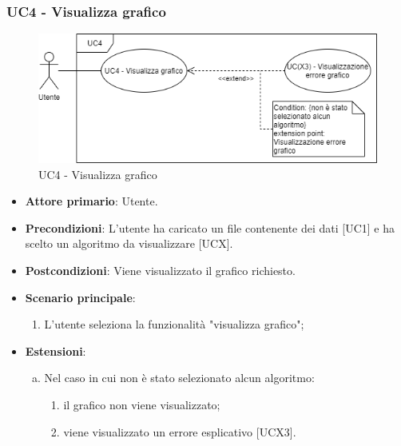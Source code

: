 \subsubsection{UC4 - Visualizza grafico}
\begin{figure}[h]
\includegraphics[width=\linewidth]{section/Images/UC4VisualizzaGrafico.png}
\centering
\caption{UC4 - Visualizza grafico}
\end{figure}
\begin{itemize}
	\item \textbf{Attore primario}: Utente.
	\item \textbf{Precondizioni}: L'utente ha caricato un file contenente dei dati [UC1] e ha scelto un algoritmo da visualizzare [UCX].
	\item \textbf{Postcondizioni}: Viene visualizzato il grafico richiesto.
	\item \textbf{Scenario principale}:
		\begin{enumerate}
			\item L'utente seleziona la funzionalità "visualizza grafico";
		\end{enumerate}
	\item \textbf{Estensioni}:
	\begin{enumerate}[(a)]
		\item Nel caso in cui non è stato selezionato alcun algoritmo:
		\begin{enumerate}[1.]
			\item il grafico non viene visualizzato;
			\item viene visualizzato un errore esplicativo [UCX3].
		\end{enumerate}
	\end{enumerate}
\end{itemize}
